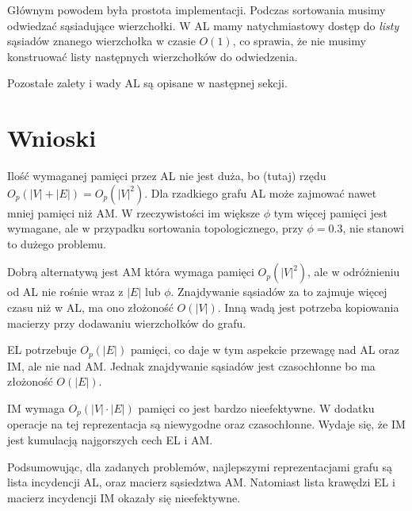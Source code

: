 \documentclass[11pt,twocolumn]{article}
\begin{document}
Głównym powodem była prostota implementacji. 
Podczas sortowania musimy odwiedzać sąsiadujące wierzchołki.
W AL mamy natychmiastowy dostęp do \emph{listy} sąsiadów znanego wierzchołka w czasie $O(1)$, 
co sprawia, że nie musimy konstruować listy następnych wierzchołków do odwiedzenia.

Pozostałe zalety i wady AL są opisane w następnej sekcji.

\section {Wnioski}

Ilość wymaganej pamięci przez AL nie jest duża, bo (tutaj) rzędu 
$O_p(|V|+|E|) = O_p(|V|^2)$. 
Dla rzadkiego grafu AL może zajmować nawet mniej pamięci niż AM.
W rzeczywistości im większe $\phi$ tym więcej pamięci jest wymagane, 
ale w przypadku sortowania topologicznego, przy $\phi = 0.3$, nie stanowi to dużego problemu.

Dobrą alternatywą jest AM która wymaga pamięci $O_p(|V|^2)$, 
ale w odróżnieniu od AL nie rośnie wraz z $|E|$ lub $\phi$. 
Znajdywanie sąsiadów za to zajmuje więcej czasu niż w AL, ma ono złożoność $O(|V|)$.
Inną wadą jest potrzeba kopiowania macierzy przy dodawaniu wierzchołków do grafu.

EL potrzebuje $O_p(|E|)$ pamięci, 
co daje w tym aspekcie przewagę nad AL oraz IM, ale nie nad AM.
Jednak znajdywanie sąsiadów jest czasochłonne bo ma złożoność $O(|E|)$.

IM wymaga $O_p(|V|\cdot|E|)$ pamięci co jest bardzo nieefektywne.
W dodatku operacje na tej reprezentacja są niewygodne oraz czasochłonne.
Wydaje się, że IM jest kumulacją najgorszych cech EL i AM.

Podsumowując, dla zadanych problemów, 
najlepszymi reprezentacjami grafu są lista incydencji AL, oraz macierz sąsiedztwa AM. 
Natomiast lista krawędzi EL i macierz incydencji IM okazały się nieefektywne.
\end{document}
